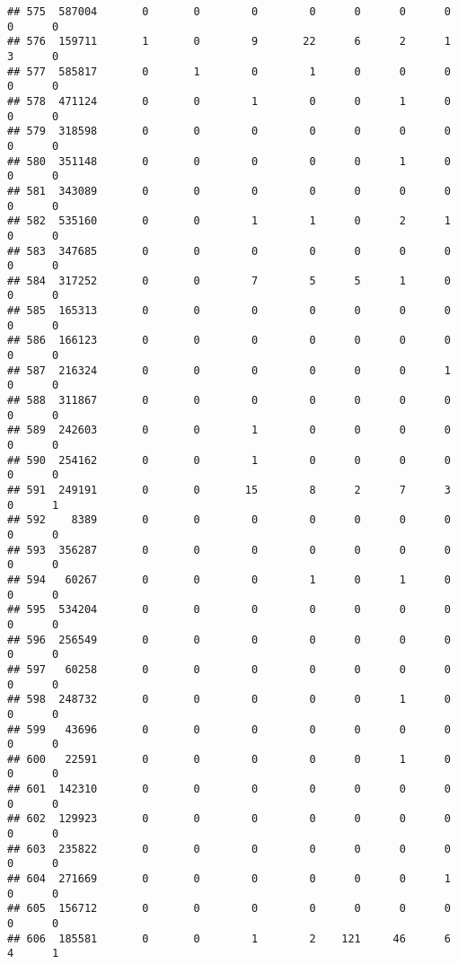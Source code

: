 \documentclass[
]{article}
\begin{document}
\begin{verbatim}
## 575  587004       0       0        0        0      0      0      0     0      0
## 576  159711       1       0        9       22      6      2      1     3      0
## 577  585817       0       1        0        1      0      0      0     0      0
## 578  471124       0       0        1        0      0      1      0     0      0
## 579  318598       0       0        0        0      0      0      0     0      0
## 580  351148       0       0        0        0      0      1      0     0      0
## 581  343089       0       0        0        0      0      0      0     0      0
## 582  535160       0       0        1        1      0      2      1     0      0
## 583  347685       0       0        0        0      0      0      0     0      0
## 584  317252       0       0        7        5      5      1      0     0      0
## 585  165313       0       0        0        0      0      0      0     0      0
## 586  166123       0       0        0        0      0      0      0     0      0
## 587  216324       0       0        0        0      0      0      1     0      0
## 588  311867       0       0        0        0      0      0      0     0      0
## 589  242603       0       0        1        0      0      0      0     0      0
## 590  254162       0       0        1        0      0      0      0     0      0
## 591  249191       0       0       15        8      2      7      3     0      1
## 592    8389       0       0        0        0      0      0      0     0      0
## 593  356287       0       0        0        0      0      0      0     0      0
## 594   60267       0       0        0        1      0      1      0     0      0
## 595  534204       0       0        0        0      0      0      0     0      0
## 596  256549       0       0        0        0      0      0      0     0      0
## 597   60258       0       0        0        0      0      0      0     0      0
## 598  248732       0       0        0        0      0      1      0     0      0
## 599   43696       0       0        0        0      0      0      0     0      0
## 600   22591       0       0        0        0      0      1      0     0      0
## 601  142310       0       0        0        0      0      0      0     0      0
## 602  129923       0       0        0        0      0      0      0     0      0
## 603  235822       0       0        0        0      0      0      0     0      0
## 604  271669       0       0        0        0      0      0      1     0      0
## 605  156712       0       0        0        0      0      0      0     0      0
## 606  185581       0       0        1        2    121     46      6     4      1

\end{verbatim}
\end{document}
